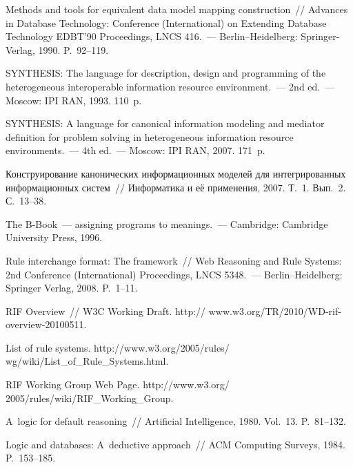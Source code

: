 \begin{multicols}{2}
{\small\frenchspacing
{%
\begin{thebibliography}{99}

Methods and tools for equivalent data model mapping construction~// 
Advances in Database Technology:  
Conference (International) on Extending Database Technology EDBT'90 Proceedings, LNCS 416.~--- 
Berlin--Heidelberg: Springer-Verlag, 1990. P.~92--119.

SYNTHESIS: The language for desсription, design and programming of the heterogeneous interoperable 
information resource environment.~--- 2nd ed.~--- Moscow: IPI RAN, 
1993. 110~p.

SYNTHESIS: A language for canonical information modeling and mediator definition for problem solving in 
heterogeneous information resource environments.~--- 4th ed.~--- 
Moscow: IPI RAN, 2007. 171~p.

Конструирование канонических информационных моделей для интегрированных информационных 
систем~// Информатика и её применения, 2007. Т.~1. Вып.~2. С.~13--38.

The B-Book~--- assigning programs to meanings.~--- Cambridge: Cambridge University Press, 1996.

Rule interchange format: The framework~// Web Reasoning and Rule Systems:  2nd Conference (International) 
Proceedings, LNCS 5348.~--- Berlin--Heidelberg: Springer Verlag, 2008. P.~1--11.

RIF Overview~// W3C Working Draft. {\sf http:// www.w3.org/TR/2010/WD-rif-overview-20100511}.

List of rule systems. {\sf http://www.w3.org/2005/rules/ wg/wiki/List\_of\_Rule\_Systems.html}.

RIF Working Group Web Page. {\sf http://www.w3.org/ 2005/rules/wiki/RIF\_Working\_Group}.

A~logic for default reasoning~// Artificial Intelligence, 1980. Vol.~13. P.~81--132.

Logic and databases: A~deductive approach~// ACM Computing Surveys, 1984. P.~153--185.


\end{thebibliography}}}
\end{multicols}
